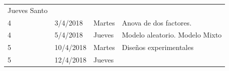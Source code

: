 \documentclass[]{book}
\theoremstyle{definition}
\theoremstyle{definition}
\theoremstyle{definition}
\theoremstyle{remark}
\begin{document}
\begin{longtable}[]{@{}llll@{}}
\begin{minipage}[t]{0.71\columnwidth}
Jueves Santo\strut
\end{minipage}\tabularnewline
\begin{minipage}[t]{0.05\columnwidth}\raggedright
4\strut
\end{minipage} & \begin{minipage}[t]{0.07\columnwidth}\raggedright
3/4/2018\strut
\end{minipage} & \begin{minipage}[t]{0.05\columnwidth}\raggedright
Martes\strut
\end{minipage} & \begin{minipage}[t]{0.71\columnwidth}\raggedright
Anova de dos factores.\strut
\end{minipage}\tabularnewline
\begin{minipage}[t]{0.05\columnwidth}\raggedright
4\strut
\end{minipage} & \begin{minipage}[t]{0.07\columnwidth}\raggedright
5/4/2018\strut
\end{minipage} & \begin{minipage}[t]{0.05\columnwidth}\raggedright
Jueves\strut
\end{minipage} & \begin{minipage}[t]{0.71\columnwidth}\raggedright
Modelo aleatorio. Modelo Mixto\strut
\end{minipage}\tabularnewline
\begin{minipage}[t]{0.05\columnwidth}\raggedright
5\strut
\end{minipage} & \begin{minipage}[t]{0.07\columnwidth}\raggedright
10/4/2018\strut
\end{minipage} & \begin{minipage}[t]{0.05\columnwidth}\raggedright
Martes\strut
\end{minipage} & \begin{minipage}[t]{0.71\columnwidth}\raggedright
Diseños experimentales\strut
\end{minipage}\tabularnewline
\begin{minipage}[t]{0.05\columnwidth}\raggedright
5\strut
\end{minipage} & \begin{minipage}[t]{0.07\columnwidth}\raggedright
12/4/2018\strut
\end{minipage} & \begin{minipage}[t]{0.05\columnwidth}\raggedright
Jueves\strut
\end{minipage} & \begin{minipage}[t]{0.71\columnwidth}\raggedright

\end{minipage}
\end{longtable}
\end{document}
